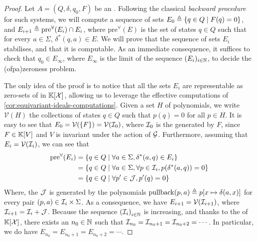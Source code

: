 \begin{proof}
  Let $A = (Q, \delta, q_0, F)$ be an . Following the classical \emph{backward procedure} for such
  systems, we will compute a sequence of sets $E_0 \triangleq \{  q \in Q  \mid 
  F(q) = 0  \}$, and $E_{i+1} \triangleq \mathrm{pre}^\forall(E_i) \cap E_i$, where
  $\mathrm{pre}^\forall(E)$ is the set of states $q \in Q$ such that for every
  $a \in \Sigma$, $\delta^*(q,a) \in E$. We will prove that the sequence of
  sets $E_i$ stabilises, and that it is computable. As an immediate
  consequence, it suffices to check that $q_0 \in E_{\infty}$, where $E_\infty$
  is the limit of the sequence $(E_i)_{i \in \mathbb{N}}$, to decide the
  \kl(ofpa){zeroness problem}.

  The only idea of the proof is to notice that all the sets $E_i$ are
  representable as zero-sets of  in
  $\mathbb{K}[\mathcal{X}]$, allowing us to leverage the effective computations of
  \cref{cor:equivariant-ideals-computations}. Given a set $H$ of polynomials,
  we write $\mathcal{V}(H)$ the collections of states $q \in Q$ such that $p(q)
  = 0$ for all $p \in H$.
  It is easy to see that $E_0 = \mathcal{V}(\set{F}) = \mathcal{V}(\idl_0)$,
  where $\idl_0$ is the  generated by $F$, since 
  $F \in \mathbb{K}[V]$ and $V$ is invariant under the action of $\mathcal{G}$.
  Furthermore, assuming that $E_i = \mathcal{V}(\idl_i)$, we can
  see that 
  \begin{align*}
    \mathrm{pre}^\forall(E_i) 
    & = \setof{ q \in Q }{ \forall a \in \Sigma, \delta^*(a,q) \in E_i } \\
    & = \setof{ q \in Q }{ \forall a \in \Sigma, \forall p \in \idl_i, p(\delta^*(a,q)) = 0 } \\
    & = \setof{ q \in Q }{ \forall p' \in \idl[J], p'(q) = 0 }
  \end{align*}
  Where, the  $\idl[J]$ is generated by the
  polynomials $\mathrm{pullback}(p,a) \triangleq p [ x \mapsto \delta(a,x)]$
  for every pair $(p, a) \in \idl_i \times \Sigma$. 
  As a consequence, we have $E_{i+1} = \mathcal{V}(\idl_{i+1})$, where
  $\idl_{i+1} = \idl_i + \idl[J]$.
  Because the sequence $\seqof{ \idl_i }[ i \in \N]$ is increasing, and thanks
  to the  of $\mathbb{K}[\mathcal{X}]$, there
  exists an $n_0 \in \mathbb{N}$ such that $\idl_{n_0} = \idl_{n_0 + 1} = \idl_{n_0 +
  2} = \cdots$. In particular, we do have $E_{n_0} = E_{n_0 + 1} = E_{n_0 + 2}
  = \cdots$.


\end{proof}
